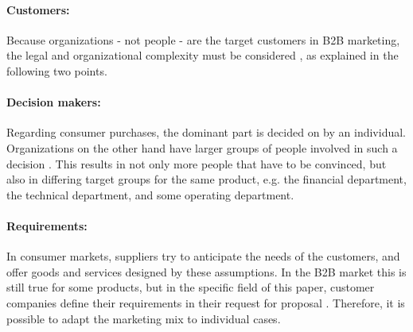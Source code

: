 \paragraph*{Customers:} 
Because organizations - not people - are the target customers in B2B marketing, the legal and organizational complexity must be considered \parencite[cf.][21]{Backhaus.2015b}, as explained in the following two points.

\paragraph*{Decision makers:} 
Regarding consumer purchases, the dominant part is decided on by an individual. Organizations on the other hand have larger groups of people involved in such a decision \parencite[cf.][21]{Backhaus.2015b}. This results in not only more people that have to be convinced, but also in differing target groups for the same product, e.g. the financial department, the technical department, and some operating department. 

\paragraph*{Requirements:} 
In consumer markets, suppliers try to anticipate the needs of the customers, and offer goods and services designed by these assumptions. In the B2B market this is still true for some products, but in the specific field of this paper, customer companies define their requirements in their request for proposal \parencite[cf.][22]{Backhaus.2015b}. Therefore, it is possible to adapt the marketing mix to individual cases.

\label{endb2b}